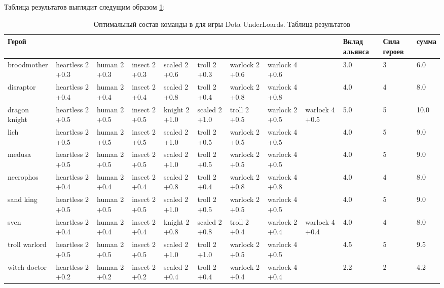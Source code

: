 \documentclass{article}
\begin{document}
Таблица результатов выглядит следущим образом \ref{solution}:
\begin{table}
\resizebox{17cm}{!} {
\begin{tabular}{l| *{8}{p{1.6cm}} | *{3}{ p{1cm}} }
\label{solution}
{Герой} &                   &               &                &                &                &                  &                  &                  &  Вклад альянса &  Сила героев &   сумма \\
\midrule
broodmother   &  heartless 2 +0.3  &  human 2 +0.3  &  insect 2 +0.3  &  scaled 2 +0.6  &   troll 2 +0.3  &  warlock  2 +0.6  &  warlock  4 +0.6  &                   &                  3.0 &           3 &   6.0 \\
disraptor     &  heartless 2 +0.4  &  human 2 +0.4  &  insect 2 +0.4  &  scaled 2 +0.8  &   troll 2 +0.4  &  warlock  2 +0.8  &  warlock  4 +0.8  &                   &                  4.0 &           4 &   8.0 \\
dragon knight &  heartless 2 +0.5  &  human 2 +0.5  &  insect 2 +0.5  &  knight 2 +1.0  &  scaled 2 +1.0  &     troll 2 +0.5  &  warlock  2 +0.5  &  warlock  4 +0.5  &                  5.0 &           5 &  10.0 \\
lich          &  heartless 2 +0.5  &  human 2 +0.5  &  insect 2 +0.5  &  scaled 2 +1.0  &   troll 2 +0.5  &  warlock  2 +0.5  &  warlock  4 +0.5  &                   &                  4.0 &           5 &   9.0 \\
medusa        &  heartless 2 +0.5  &  human 2 +0.5  &  insect 2 +0.5  &  scaled 2 +1.0  &   troll 2 +0.5  &  warlock  2 +0.5  &  warlock  4 +0.5  &                   &                  4.0 &           5 &   9.0 \\
necrophos     &  heartless 2 +0.4  &  human 2 +0.4  &  insect 2 +0.4  &  scaled 2 +0.8  &   troll 2 +0.4  &  warlock  2 +0.8  &  warlock  4 +0.8  &                   &                  4.0 &           4 &   8.0 \\
sand king     &  heartless 2 +0.5  &  human 2 +0.5  &  insect 2 +0.5  &  scaled 2 +1.0  &   troll 2 +0.5  &  warlock  2 +0.5  &  warlock  4 +0.5  &                   &                  4.0 &           5 &   9.0 \\
sven          &  heartless 2 +0.4  &  human 2 +0.4  &  insect 2 +0.4  &  knight 2 +0.8  &  scaled 2 +0.8  &     troll 2 +0.4  &  warlock  2 +0.4  &  warlock  4 +0.4  &                  4.0 &           4 &   8.0 \\
troll warlord &  heartless 2 +0.5  &  human 2 +0.5  &  insect 2 +0.5  &  scaled 2 +1.0  &   troll 2 +1.0  &  warlock  2 +0.5  &  warlock  4 +0.5  &                   &                  4.5 &           5 &   9.5 \\
witch doctor  &  heartless 2 +0.2  &  human 2 +0.2  &  insect 2 +0.2  &  scaled 2 +0.4  &   troll 2 +0.4  &  warlock  2 +0.4  &  warlock  4 +0.4  &                   &                  2.2 &           2 &   4.2 \\
\bottomrule
\end{tabular}
}
\caption{Оптимальный состав команды в для игры Dota UnderLoards. Таблица результатов }
\end{table}
\end{document}
